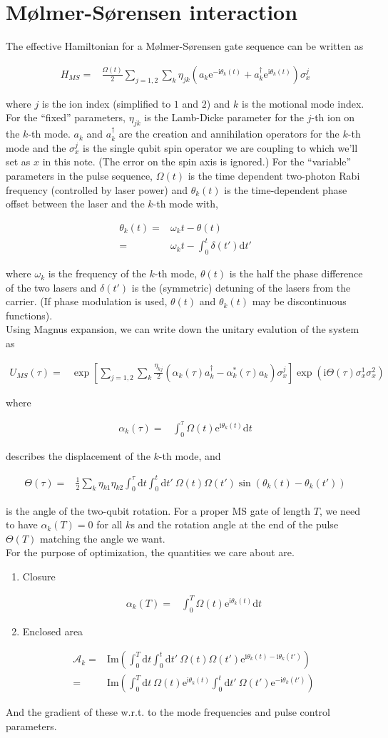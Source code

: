 \documentclass[10pt,fleqn]{article}
\newcommand{\ud}{\mathrm{d}}
\newcommand{\ue}{\mathrm{e}}
\newcommand{\ui}{\mathrm{i}}
\newcommand{\eqar}[1]
{
  \begin{align*}
    #1
  \end{align*}
}
\newcommand{\paren}[1]{{\left({#1}\right)}}
\newcommand{\sqr}[1]{{\left[{#1}\right]}}
\begin{document}
\section{M{\o}lmer-S{\o}rensen interaction}
The effective Hamiltonian for a M{\o}lmer-S{\o}rensen gate sequence can be written as
\eqar{
  H_{MS}=&\frac{\Omega(t)}{2}\sum_{j=1,2}\sum_{k}\eta_{jk}\paren{a_k\ue^{-\ui\theta_k(t)}+a_k^\dagger\ue^{\ui\theta_k(t)}}\sigma^j_x
}
where $j$ is the ion index (simplified to $1$ and $2$)
and $k$ is the motional mode index.
For the ``fixed'' parameters, $\eta_{jk}$ is the Lamb-Dicke parameter for the $j$-th
ion on the $k$-th mode. $a_k$ and $a^\dagger_k$ are the creation and annihilation
operators for the $k$-th mode and the $\sigma_x^j$ is the single qubit spin operator
we are coupling to which we'll set as $x$ in this note.
(The error on the spin axis is ignored.)
For the ``variable'' parameters in the pulse sequence,
$\Omega(t)$ is the time dependent two-photon Rabi frequency (controlled by laser power)
and $\theta_k(t)$ is the time-dependent phase offset between the laser and the $k$-th
mode with,
\eqar{
  \theta_k(t)=&\omega_kt-\theta(t)\\
  =&\omega_kt-\int_0^t\delta(t')\ud t'
}
where $\omega_k$ is the frequency of the $k$-th mode,
$\theta(t)$ is the half the phase difference of the two lasers
and $\delta(t')$ is the (symmetric) detuning of the lasers from the carrier.
(If phase modulation is used, $\theta(t)$ and $\theta_k(t)$
may be discontinuous functions).\\

Using Magnus expansion, we can write down the unitary evalution of the system as
\eqar{
  U_{MS}(\tau)=&\exp\sqr{\sum_{j=1,2}\sum_{k}\frac{\eta_{kj}}{2}\paren{\alpha_k(\tau)a^\dagger_k-\alpha^*_k(\tau)a_k}\sigma^j_x}\exp\paren{\ui\Theta(\tau)\sigma^1_x\sigma^2_x}
}
where
\eqar{
  \alpha_k(\tau)=&\int_0^\tau\Omega(t)\ue^{\ui\theta_k(t)}\ud t
}
describes the displacement of the $k$-th mode, and
\eqar{
  \Theta(\tau)=&\frac{1}{2}\sum_k\eta_{k1}\eta_{k2}\int_0^\tau\!\!\ud t\int_0^t\!\!\ud t'
  \ \Omega(t)\Omega(t')\sin(\theta_k(t)-\theta_k(t'))
}
is the angle of the two-qubit rotation. For a proper MS gate of length $T$,
we need to have $\alpha_k(T)=0$ for all $k$s and the rotation angle
at the end of the pulse $\Theta(T)$ matching the angle we want.\\

For the purpose of optimization, the quantities we care about are.
\begin{enumerate}
\item Closure
  \eqar{
    \alpha_k(T)=&\int_0^T\Omega(t)\ue^{\ui\theta_k(t)}\ud t
  }
\item Enclosed area
  \eqar{
    \mathcal{A}_k=&\mathrm{Im}\paren{\int_0^T\!\!\ud t\int_0^t\!\!\ud t'
      \ \Omega(t)\Omega(t')\ue^{\ui\theta_k(t)-\ui\theta_k(t')}}\\
    =&\mathrm{Im}\paren{\int_0^T\!\!\ud t\ \Omega(t)\ue^{\ui\theta_k(t)}\int_0^t\!\!\ud t'
      \ \Omega(t')\ue^{-\ui\theta_k(t')}}
  }
\end{enumerate}
And the gradient of these w.r.t. to the mode frequencies and pulse control parameters.\\
\end{document}
